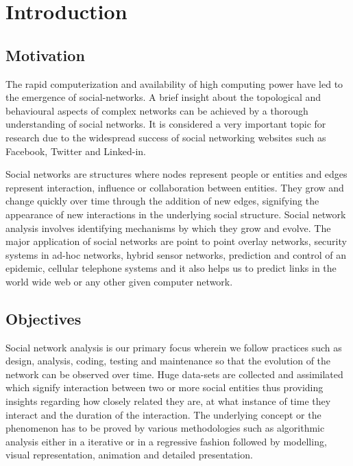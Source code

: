 \chapter{Introduction}
\ifpdf
    \graphicspath{{Introduction/IntroductionFigs/PNG/}{Introduction/IntroductionFigs/PDF/}{Introduction/IntroductionFigs/}}
\else
    \graphicspath{{Introduction/IntroductionFigs/EPS/}{Introduction/IntroductionFigs/}}
\fi


\section{Motivation}
The rapid computerization and availability of high computing power have led to the emergence of social-networks. A brief insight about the topological and behavioural aspects of complex networks can be achieved by a thorough understanding of social networks. It is considered a very important topic for research due to the widespread success of social networking websites such as Facebook, Twitter and Linked-in.

Social networks are structures where nodes represent people or entities and edges represent interaction, influence or collaboration between entities. They grow and change quickly over time through the addition of new edges, signifying the appearance of new interactions in the underlying social structure. Social network analysis involves identifying mechanisms by which they grow and evolve. The major application of social networks are point to point overlay networks, security systems in ad-hoc networks, hybrid sensor networks, prediction and control of an epidemic, cellular telephone systems and it also helps us to predict links in the world wide web or any other given computer network.

\section{Objectives}
Social network analysis is our primary focus wherein we follow practices such as design, analysis, coding, testing and maintenance so that the evolution of the network can be observed over time. Huge data-sets are collected and assimilated which signify interaction between two or more social entities thus providing insights regarding how closely related they are, at what instance of time they interact and the duration of the interaction. The underlying concept or the phenomenon has to be proved by various methodologies such as algorithmic analysis either in a iterative or in a regressive fashion followed by modelling, visual representation, animation and detailed presentation.

